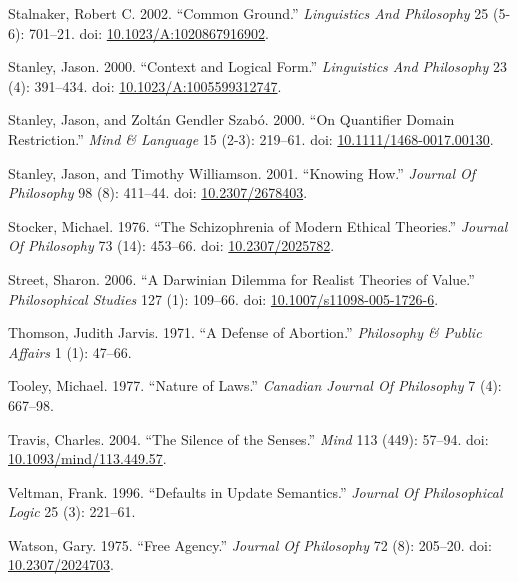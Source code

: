 \documentclass[
  10pt,
  letterpaper,
  DIV=11,
  numbers=noendperiod,
  twoside]{scrartcl}
\newlength{\cslhangindent}
\newenvironment{CSLReferences}[2] %
 {\begin{list}{}{%
  \setlength{\itemindent}{0pt}
  \setlength{\leftmargin}{0pt}
  \setlength{\parsep}{0pt}
  \ifodd #1
   \setlength{\leftmargin}{\cslhangindent}
   \setlength{\itemindent}{-1\cslhangindent}
  \fi
  \setlength{\itemsep}{#2\baselineskip}}}
 {\end{list}}
\begin{document}
\begin{CSLReferences}{1}{0}
Stalnaker, Robert C. 2002. {``Common Ground.''} \emph{Linguistics And
Philosophy} 25 (5-6): 701--21. doi:
\href{https://doi.org/10.1023/A:1020867916902}{10.1023/A:1020867916902}.

Stanley, Jason. 2000. {``Context and Logical Form.''} \emph{Linguistics
And Philosophy} 23 (4): 391--434. doi:
\href{https://doi.org/10.1023/A:1005599312747}{10.1023/A:1005599312747}.

Stanley, Jason, and Zoltán Gendler Szabó. 2000. {``On Quantifier Domain
Restriction.''} \emph{Mind \& Language} 15 (2-3): 219--61. doi:
\href{https://doi.org/10.1111/1468-0017.00130}{10.1111/1468-0017.00130}.

Stanley, Jason, and Timothy Williamson. 2001. {``Knowing How.''}
\emph{Journal Of Philosophy} 98 (8): 411--44. doi:
\href{https://doi.org/10.2307/2678403}{10.2307/2678403}.

Stocker, Michael. 1976. {``The Schizophrenia of Modern Ethical
Theories.''} \emph{Journal Of Philosophy} 73 (14): 453--66. doi:
\href{https://doi.org/10.2307/2025782}{10.2307/2025782}.

Street, Sharon. 2006. {``A Darwinian Dilemma for Realist Theories of
Value.''} \emph{Philosophical Studies} 127 (1): 109--66. doi:
\href{https://doi.org/10.1007/s11098-005-1726-6}{10.1007/s11098-005-1726-6}.

Thomson, Judith Jarvis. 1971. {``A Defense of Abortion.''}
\emph{Philosophy \& Public Affairs} 1 (1): 47--66.

Tooley, Michael. 1977. {``Nature of Laws.''} \emph{Canadian Journal Of
Philosophy} 7 (4): 667--98.

Travis, Charles. 2004. {``The Silence of the Senses.''} \emph{Mind} 113
(449): 57--94. doi:
\href{https://doi.org/10.1093/mind/113.449.57}{10.1093/mind/113.449.57}.

Veltman, Frank. 1996. {``Defaults in Update Semantics.''} \emph{Journal
Of Philosophical Logic} 25 (3): 221--61.

Watson, Gary. 1975. {``Free Agency.''} \emph{Journal Of Philosophy} 72
(8): 205--20. doi:
\href{https://doi.org/10.2307/2024703}{10.2307/2024703}.


\end{CSLReferences}
\end{document}
